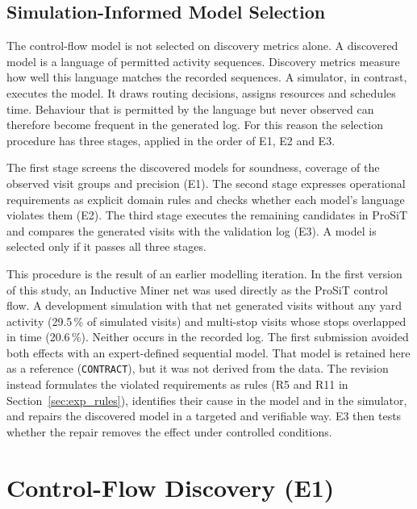 \subsection{Simulation-Informed Model Selection}
\label{sec:exp_selection_logic}

The control-flow model is not selected on discovery metrics alone. A
discovered model is a language of permitted activity sequences.
Discovery metrics measure how well this language matches the recorded
sequences. A simulator, in contrast, executes the model. It draws routing
decisions, assigns resources and schedules time. Behaviour that is
permitted by the language but never observed can therefore become
frequent in the generated log. For this reason the selection procedure
has three stages, applied in the order of E1, E2 and E3.

The first stage screens the discovered models for soundness, coverage of
the observed visit groups and precision (E1). The second stage expresses
operational requirements as explicit domain rules and checks whether
each model's language violates them (E2). The third stage executes the
remaining candidates in ProSiT and compares the generated visits with
the validation log (E3). A model is selected only if it passes all three
stages.

This procedure is the result of an earlier modelling iteration. In the
first version of this study, an Inductive Miner net was used directly as
the ProSiT control flow. A development simulation with that net
generated visits without any yard activity (29.5\,\% of simulated
visits) and multi-stop visits whose stops overlapped in time (20.6\,\%).
Neither occurs in the recorded log. The first submission avoided both
effects with an expert-defined sequential model. That model is retained
here as a reference (\texttt{CONTRACT}), but it was not derived from
the data. The revision instead formulates the violated requirements as
rules (R5 and R11 in Section~\ref{sec:exp_rules}), identifies their cause
in the model and in the simulator, and repairs the discovered model in a
targeted and verifiable way. E3 then tests whether the repair removes
the effect under controlled conditions.

\section{Control-Flow Discovery (E1)}
\label{sec:exp_discovery}

